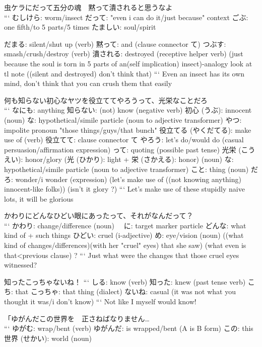 虫ケラにだって五分の魂　黙って潰されると思うなよ \\
```
むしけら: worm/insect
だって: "even i can do it/just because" context
ごぶ: one fifth/to 5 parts/5 times
たましい: soul/spirit

だまる: silent/shut up (verb)
黙って: and (clause connector て)
つぶす: smash/crush/destroy (verb)
潰される: destroyed (receptive helper verb)
(just because the soul is torn in 5 parts of an(self implication) insect)-analogy look at tl note ((silent and destroyed) don't think that)
```
Even an insect has its own mind, don't think that you can crush them that easily

何も知らない初心なヤツを役立ててやろうって、光栄なことだろ \\
```
なにも: anything
    知らない: (not) know (negative verb)
            初心 (うぶ): innocent (noun)
                な: hypothetical/simile particle (noun to adjective transformer)
                  やつ: impolite pronoun "those things/guys/that bunch"
                    役立てる (やくだてる): make use of (verb)
                    役立てて: clause connector て
                                やろう: let's do/would do (casual persuasion/affirmation expression)
                                って: quoting (possible past tense)
光栄 (こうえい): honor/glory (光 (ひかり): light + 栄 (さかえる): honor) (noun)
な: hypothetical/simile particle (noun to adjective transformer)
こと: thing (noun)
だろ: wonder/i wonder (expression)
(let's make use of ((not knowing anything) innocent-like folks)) (isn't it glory ?)
```
Let's make use of these stupidly naive lots, it will be glorious

かわりにどんなひどい眼にあったって、それがなんだって？ \\
```
かわり: change/difference (noun)
    　に: target marker particle
        どんな: what kind of + such things
              ひどい: cruel (i-adjective)
                    め: eye/vision (noun)
((what kind of changes/differences)(with her "cruel" eyes) that she saw) (what even is that<previous clause) ?
```
Just what were the changes that those cruel eyes witnessed?

知ったこっちゃないね！
```
しる: know (verb)
知った: knew (past tense verb)
こち: that
こっちゃ: that thing (dialect)
ないね: casual
(it was not what you thought it was/i don't know)
```
Not like I myself would know!

「ゆがんだこの世界を　正さねばなりません… \\
```
ゆがむ: wrap/bent (verb)
ゆがんだ: is wrapped/bent (A is B form)
この: this
世界 (せかい): world (noun)

